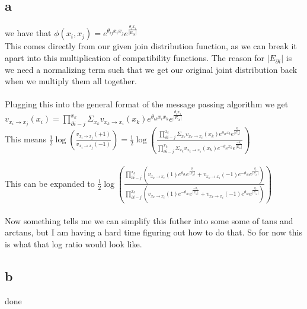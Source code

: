 \documentclass[12pt]{article}
\begin{document}
\subsection{a}
we have that $\phi(x_i,x_j) = e^{\theta_{ij}x_ix_j}e^{\frac{\theta_{i}x_i}{|E_{\partial i}|} }$ \\
This comes directly from our given join distribution function, as we can break it apart into this multiplication of compatibility functions. The reason for $|E_{\partial i}|$ is we need a normalizing term such that we get our original joint distribution back when we multiply them all together.
\\
\\
Plugging this into the general format of the message passing algorithm we get $v_{x_{i}\rightarrow x_{j}}(x_i) = \prod_{\partial i - j}^{x_k}\Sigma_{x_k}v_{x_k \rightarrow x_i}(x_k)e^{\theta_{ik}x_ix_k}e^{\frac{\theta_{i}x_i}{|E_{\partial i}|} }$
\\
This means $\frac{1}{2}\log(\frac{v_{x_{i}\rightarrow x_{j}}(+1)}{v_{x_{i}\rightarrow x_{j}}(-1)}) = \frac{1}{2}\log(\frac{\prod_{\partial i - j}^{x_k}\Sigma_{x_k}v_{x_k \rightarrow x_i}(x_k)e^{\theta_{ik}x_k}e^{\frac{\theta_{i}}{|E_{\partial i}|} }}
{\prod_{\partial i - j}^{x_k}\Sigma_{x_k}v_{x_k \rightarrow x_i}(x_k)e^{-\theta_{ik}x_k}e^{\frac{-\theta_{i}}{|E_{\partial i}|} }})$
\\
\\
This can be expanded to 
$\frac{1}{2}\log(\frac{\prod_{\partial i - j}^{x_k}
	(v_{x_k \rightarrow x_i}(1)e^{\theta_{ik}}e^{\frac{\theta_{i}}{|E_{\partial i}|} }
	+
	v_{x_k \rightarrow x_i}(-1)e^{-\theta_{ik}}e^{\frac{\theta_{i}}{|E_{\partial i}|} }	
	)}{\prod_{\partial i - j}^{x_k}(
	v_{x_k \rightarrow x_i}(1)e^{-\theta_{ik}}e^{\frac{-\theta_{i}}{|E_{\partial i}|} }
	+ 
	v_{x_k \rightarrow x_i}(-1)e^{\theta_{ik}}e^{\frac{\theta_{i}}{|E_{\partial i}|} })
})$
\\
\\
Now something tells me we can simplify this futher into some some of tans and arctans, but I am having a hard time figuring out how to do that. So for now this is what that log ratio would look like.
\subsection{b}
done
\end{document}
